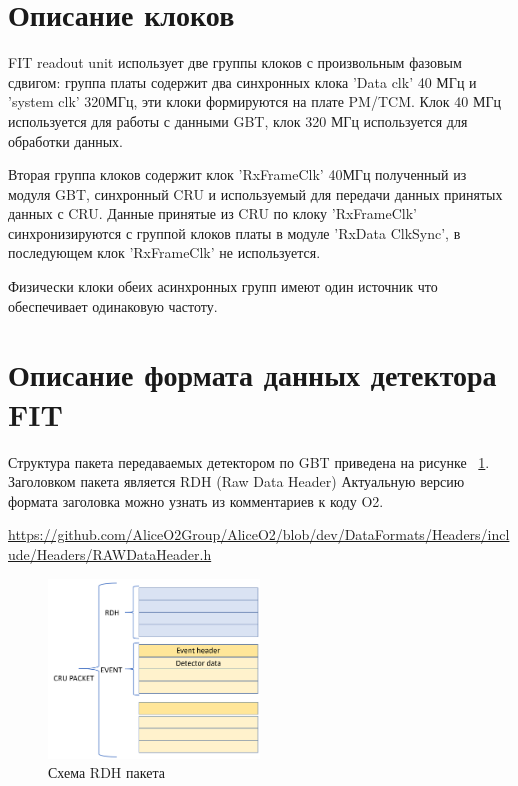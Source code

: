\documentclass{article}
\begin{document}
\section{Описание клоков}
FIT readout unit использует две группы клоков с   произвольным  фазовым сдвигом: группа платы содержит два синхронных клока 'Data clk' 40 МГц и 'system clk' 320МГц, эти клоки  формируются на плате PM/TCM. Клок 40 МГц используется для работы с данными GBT, клок 320 МГц используется для обработки данных. 

Вторая группа клоков содержит клок 'RxFrameClk' 40МГц полученный из модуля GBT, синхронный CRU и используемый для передачи данных принятых данных с CRU. Данные принятые из CRU по клоку 'RxFrameClk' синхронизируются с группой клоков платы в модуле 'RxData ClkSync', в последующем клок 'RxFrameClk' не используется.

Физически клоки обеих асинхронных групп имеют один источник что обеспечивает одинаковую частоту.


\section{Описание формата данных детектора FIT}
Структура пакета передаваемых детектором по GBT приведена на рисунке  ~\ref{fig:7}. Заголовком пакета является  RDH (Raw Data Header) Актуальную версию формата заголовка можно узнать из комментариев к коду O2.

\url{https://github.com/AliceO2Group/AliceO2/blob/dev/DataFormats/Headers/include/Headers/RAWDataHeader.h}


\begin{figure}[H]
	\centering 
	\includegraphics[width=0.5\textwidth]{RDH_scheme.png}
	\caption{\label{fig:7} Схема RDH пакета}
\end{figure}
\end{document}
